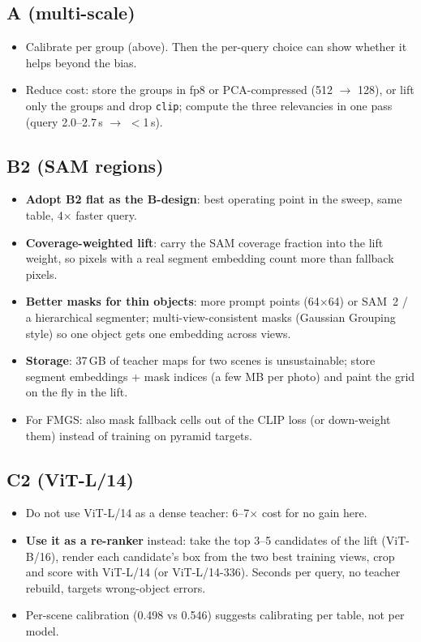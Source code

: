 \documentclass[11pt,a4paper]{article}
\newcommand{\code}[1]{\texttt{#1}}
\begin{document}
\subsection{A (multi-scale)}
\begin{itemize}
  \item Calibrate per group (above). Then the per-query choice can show whether it helps beyond the bias.
  \item Reduce cost: store the groups in fp8 or PCA-compressed (512 $\rightarrow$ 128), or lift only the groups and drop
        \code{clip}; compute the three relevancies in one pass (query 2.0--2.7\,s $\rightarrow$ $<$1\,s).
\end{itemize}

\subsection{B2 (SAM regions)}
\begin{itemize}
  \item \textbf{Adopt B2 flat as the B-design}: best operating point in the sweep, same table, 4$\times$ faster query.
  \item \textbf{Coverage-weighted lift}: carry the SAM coverage fraction into the lift weight, so pixels with a real segment
        embedding count more than fallback pixels.
  \item \textbf{Better masks for thin objects}: more prompt points (64$\times$64) or SAM~2 / a hierarchical segmenter;
        multi-view-consistent masks (Gaussian Grouping style) so one object gets one embedding across views.
  \item \textbf{Storage}: 37\,GB of teacher maps for two scenes is unsustainable; store segment embeddings + mask indices
        (a few MB per photo) and paint the grid on the fly in the lift.
  \item For FMGS: also mask fallback cells out of the CLIP loss (or down-weight them) instead of training on pyramid
        targets.
\end{itemize}

\subsection{C2 (ViT-L/14)}
\begin{itemize}
  \item Do not use ViT-L/14 as a dense teacher: 6--7$\times$ cost for no gain here.
  \item \textbf{Use it as a re-ranker} instead: take the top 3--5 candidates of the lift (ViT-B/16), render each candidate's
        box from the two best training views, crop and score with ViT-L/14 (or ViT-L/14-336). Seconds per query, no
        teacher rebuild, targets wrong-object errors.
  \item Per-scene calibration (0.498 vs 0.546) suggests calibrating per table, not per model.
\end{itemize}
\end{document}
